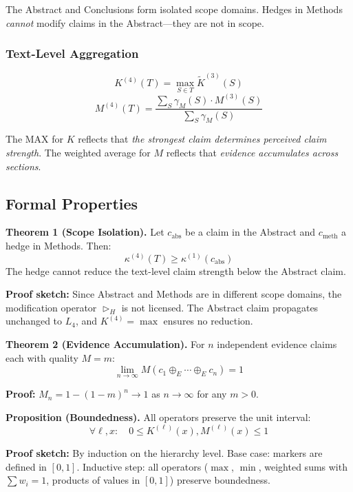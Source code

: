 The Abstract and Conclusions form isolated scope domains. Hedges in Methods \emph{cannot} modify claims in the Abstract---they are not in scope.

\subsubsection{Text-Level Aggregation}

\begin{equation}
K^{(4)}(T) = \max_{S \in T} \tilde{K}^{(3)}(S)
\end{equation}
\begin{equation}
M^{(4)}(T) = \frac{\sum_S \gamma_M(S) \cdot M^{(3)}(S)}{\sum_S \gamma_M(S)}
\end{equation}

The MAX for $K$ reflects that \emph{the strongest claim determines perceived claim strength}. The weighted average for $M$ reflects that \emph{evidence accumulates across sections}.


\subsection{Formal Properties}

\begin{assumptionbox}
\textbf{Theorem 1 (Scope Isolation).}
Let $c_{\text{abs}}$ be a claim in the Abstract and $c_{\text{meth}}$ a hedge in Methods. Then:
\begin{equation}
\kappa^{(4)}(T) \geq \kappa^{(1)}(c_{\text{abs}})
\end{equation}
The hedge cannot reduce the text-level claim strength below the Abstract claim.

\textbf{Proof sketch:} Since Abstract and Methods are in different scope domains, the modification operator $\triangleright_H$ is not licensed. The Abstract claim propagates unchanged to $L_4$, and $K^{(4)} = \max$ ensures no reduction.

\vspace{1em}
\textbf{Theorem 2 (Evidence Accumulation).}
For $n$ independent evidence claims each with quality $M = m$:
\begin{equation}
\lim_{n \to \infty} M(c_1 \oplus_E \cdots \oplus_E c_n) = 1
\end{equation}

\textbf{Proof:} $M_n = 1 - (1-m)^n \to 1$ as $n \to \infty$ for any $m > 0$.

\vspace{1em}
\textbf{Proposition (Boundedness).}
All operators preserve the unit interval:
\begin{equation}
\forall \ell, x: \quad 0 \leq K^{(\ell)}(x), M^{(\ell)}(x) \leq 1
\end{equation}

\textbf{Proof sketch:} By induction on the hierarchy level. Base case: markers are defined in $[0,1]$. Inductive step: all operators ($\max$, $\min$, weighted sums with $\sum w_i = 1$, products of values in $[0,1]$) preserve boundedness.
\end{assumptionbox}


